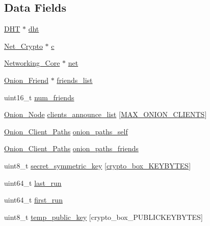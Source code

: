 \subsection*{Data Fields}
\begin{DoxyCompactItemize}
\item 
\hyperlink{struct_d_h_t}{D\+H\+T} $\ast$ \hyperlink{struct_onion___client_a8b3d6ce8745acc52695e252bdb1531b6}{dht}
\item 
\hyperlink{struct_net___crypto}{Net\+\_\+\+Crypto} $\ast$ \hyperlink{struct_onion___client_a0f5b9349eb586149cef9017eed2abdfe}{c}
\item 
\hyperlink{struct_networking___core}{Networking\+\_\+\+Core} $\ast$ \hyperlink{struct_onion___client_aa14ea2f67950f57fe4235d7375a2216c}{net}
\item 
\hyperlink{struct_onion___friend}{Onion\+\_\+\+Friend} $\ast$ \hyperlink{struct_onion___client_ad2d8940ddd914d8b046938ef4f9d313d}{friends\+\_\+list}
\item 
uint16\+\_\+t \hyperlink{struct_onion___client_a8ee1f2d7e543bce350c591a8eaac0cf8}{num\+\_\+friends}
\item 
\hyperlink{struct_onion___node}{Onion\+\_\+\+Node} \hyperlink{struct_onion___client_a21a83b6615ce3ab53739031a355aeabd}{clients\+\_\+announce\+\_\+list} \mbox{[}\hyperlink{onion__client_8h_ab1de7815e06277ced6779ba201b0b716}{M\+A\+X\+\_\+\+O\+N\+I\+O\+N\+\_\+\+C\+L\+I\+E\+N\+T\+S}\mbox{]}
\item 
\hyperlink{struct_onion___client___paths}{Onion\+\_\+\+Client\+\_\+\+Paths} \hyperlink{struct_onion___client_a917f02fe81d007c9668083e0ac9ff0c7}{onion\+\_\+paths\+\_\+self}
\item 
\hyperlink{struct_onion___client___paths}{Onion\+\_\+\+Client\+\_\+\+Paths} \hyperlink{struct_onion___client_a52bae59a292facb41ff98ea0efe8e68f}{onion\+\_\+paths\+\_\+friends}
\item 
uint8\+\_\+t \hyperlink{struct_onion___client_ab9f2ff47bc0b1e5110202a6e4be86390}{secret\+\_\+symmetric\+\_\+key} \mbox{[}\hyperlink{crypto__core_8h_aade7cd33abc5668970c55ed009ab00c8}{crypto\+\_\+box\+\_\+\+K\+E\+Y\+B\+Y\+T\+E\+S}\mbox{]}
\item 
uint64\+\_\+t \hyperlink{struct_onion___client_a73e8197b772061572cb931a378ade3e4}{last\+\_\+run}
\item 
uint64\+\_\+t \hyperlink{struct_onion___client_abd365b47c75ee96603245d7137d6e21c}{first\+\_\+run}
\item 
uint8\+\_\+t \hyperlink{struct_onion___client_afc342de3f1533c0adfd762a6fd0d20ab}{temp\+\_\+public\+\_\+key} \mbox{[}crypto\+\_\+box\+\_\+\+P\+U\+B\+L\+I\+C\+K\+E\+Y\+B\+Y\+T\+E\+S\mbox{]}

\end{DoxyCompactItemize}
